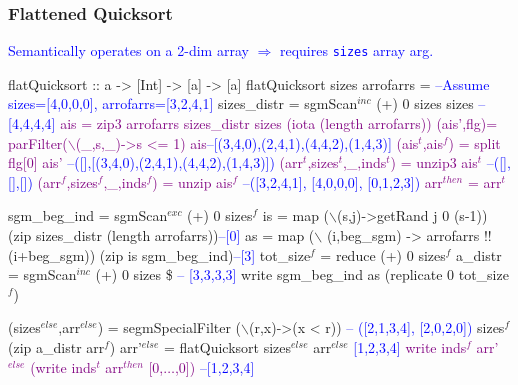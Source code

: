 \documentclass{beamer}
\newcommand{\blue}[1]{\textcolor{Blue}{{#1}}}
\newcommand{\purple}[1]{\textcolor{Purple}{{#1}}}
\renewcommand{\emph}[1]{\textcolor{structure}{#1}}
\newcommand{\emp}[1]{\textcolor{DikuRed}{ #1}}
\newcommand{\mymath}[1]{$ #1 $}
\newcommand{\myindu}[1]{^{#1}}
\begin{document}
\begin{frame}[fragile,t]
  \frametitle{Flattened Quicksort}

\blue{Semantically operates on a 2-dim array $\Rightarrow$ requires {\tt sizes} array arg.}

\begin{colorcode}[fontsize=\scriptsize]
flatQuicksort :: a -> [Int] -> [a] -> [a]
flatQuicksort sizes arrofarrs = \blue{--Assume sizes=[4,0,0,0], arrofarrs=[3,2,4,1]}
sizes_distr = sgmScan\mymath{\myindu{inc}} (+) 0 sizes sizes \blue{-- [4,4,4,4]}
\purple{ais = zip3 arrofarrs sizes_distr sizes (iota (length arrofarrs))}
\purple{(ais',flg)=\emp{parFilter}(\mymath{\backslash}(_,s,_)->s <= 1) ais}\blue{--[(3,4,0),(2,4,1),(4,4,2),(1,4,3)]}
\purple{(ais\mymath{\myindu{t}},ais\mymath{\myindu{f}}) = split flg[0] ais'}        \blue{--([],[(3,4,0),(2,4,1),(4,4,2),(1,4,3)])}
\purple{(arr\mymath{\myindu{t}},sizes\mymath{\myindu{t}},_,inds\mymath{\myindu{t}}) = unzip3 ais\mymath{\myindu{t}}}                 \blue{--([],[],[])}
\purple{(arr\mymath{\myindu{f}},sizes\mymath{\myindu{f}},_,inds\mymath{\myindu{f}}) = unzip ais\mymath{\myindu{f}}}                 \blue{--([3,2,4,1], [4,0,0,0], [0,1,2,3])}
\purple{arr\mymath{\myindu{then}} = arr\mymath{\myindu{t}}}

sgm_beg_ind = sgmScan\mymath{\myindu{exc}} (+) 0 sizes\mymath{\myindu{f}}
\emph{is = map (\mymath{\backslash}(s,j)->getRand j 0 (s-1)) (zip sizes_distr (length arrofarrs))}\blue{--[0]}
\emph{as = map (\mymath{\backslash} (i,beg_sgm) -> arrofarrs !! (i+beg_sgm)) (zip is sgm_beg_ind)}\blue{--[3]}
tot_size\mymath{\myindu{f}} = reduce (+) 0 sizes\mymath{\myindu{f}}
a_distr = sgmScan\mymath{\myindu{inc}} (+) 0 sizes \$ \blue{-- [3,3,3,3]}
          write sgm_beg_ind as (replicate 0 tot_size\mymath{\myindu{f}}) 

\emp{(sizes\mymath{\myindu{else}},arr\mymath{\myindu{else}}) = segmSpecialFilter (\mymath{\backslash}(r,x)->(x < r))} \blue{-- ([2,1,3,4], [2,0,2,0])}
                   \emp{sizes\mymath{\myindu{f}} (zip a_distr arr\mymath{\myindu{f}})}
\alert{arr'\mymath{\myindu{else}} = flatQuicksort sizes\mymath{\myindu{else}} arr\mymath{\myindu{else}}} \blue{[1,2,3,4]}
\purple{write inds\mymath{\myindu{f}} arr'\mymath{\myindu{else}} (write inds\mymath{\myindu{t}} arr\mymath{\myindu{then}} [0,\mymath{\ldots},0])} \blue{--[1,2,3,4]}
\end{colorcode}

\end{frame}
\end{document}
